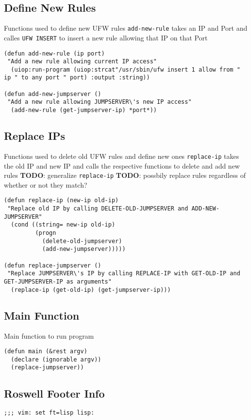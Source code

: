 \documentclass[11pt]{article}
\begin{document}
\subsection{Define New Rules}
\label{sec:orgf1f679b}
Functions used to define new UFW rules
\texttt{add-new-rule} takes an IP and Port and calles \texttt{UFW INSERT} to insert a new rule allowing that IP on that Port

\begin{verbatim}
(defun add-new-rule (ip port)
 "Add a new rule allowing current IP access"
  (uiop:run-program (uiop:strcat"/usr/sbin/ufw insert 1 allow from " ip " to any port " port) :output :string))

(defun add-new-jumpserver ()
 "Add a new rule allowing JUMPSERVER\'s new IP access"
  (add-new-rule (get-jumpserver-ip) *port*))

\end{verbatim}

\subsection{Replace IPs}
\label{sec:org0c2e722}
Functions used to delete old UFW rules and define new ones
\texttt{replace-ip} takes the old IP and new IP and calls the respective functions to delete and add new rules
\textbf{TODO}: generalize \texttt{replace-ip}
\textbf{TODO}: possbily replace rules regardless of whether or not they match?

\begin{verbatim}
(defun replace-ip (new-ip old-ip)
 "Replace old IP by calling DELETE-OLD-JUMPSERVER and ADD-NEW-JUMPSERVER"
  (cond ((string= new-ip old-ip)
         (progn
           (delete-old-jumpserver)
           (add-new-jumpserver)))))

(defun replace-jumpserver ()
 "Replace JUMPSERVER\'s IP by calling REPLACE-IP with GET-OLD-IP and GET-JUMPSERVER-IP as arguments"
  (replace-ip (get-old-ip) (get-jumpserver-ip)))

\end{verbatim}

\subsection{Main Function}
\label{sec:org2e68c83}
Main function to run program

\begin{verbatim}
(defun main (&rest argv)
  (declare (ignorable argv))
  (replace-jumpserver))

\end{verbatim}

\subsection{Roswell Footer Info}
\label{sec:org992dc2a}
\begin{verbatim}
;;; vim: set ft=lisp lisp:
\end{verbatim}
\end{document}
